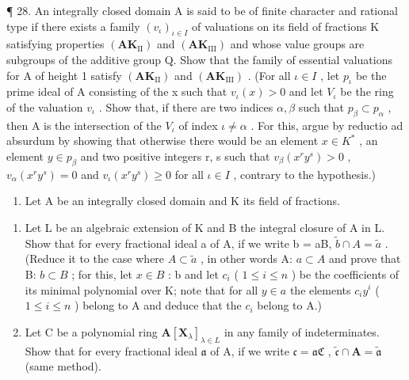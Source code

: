 ¶ 28. An integrally closed domain A is said to be of finite character and rational type if there exists a family \((v_{\iota})_{\iota \in I}\) of valuations on its field of fractions K satisfying properties \((\mathbf{AK}_{\mathrm{II}})\) and \((\mathbf{AK}_{\mathrm{III}})\) and whose value groups are subgroups of the additive group Q. Show that the family of essential valuations for A of height 1 satisfy \((\mathbf{AK}_{\mathrm{II}})\) and \((\mathbf{AK}_{\mathrm{III}})\) . (For all \(\iota \in I\) , let \(p_{\iota}\) be the prime ideal of A consisting of the x such that \(v_{\iota}(x) > 0\) and let \(V_{\iota}\) be the ring of the valuation \(v_{\iota}\) . Show that, if there are two indices \(\alpha, \beta\) such that \(p_{\beta} \subset p_{\alpha}\) , then A is the intersection of the \(V_{\iota}\) of index \(\iota \neq \alpha\) . For this, argue by reductio ad absurdum by showing that otherwise there would be an element \(x \in K^{*}\) , an element \(y \in p_{\beta}\) and two positive integers r, s such that \(v_{\beta}(x^{r}y^{s}) > 0\) , \(v_{\alpha}(x^{r}y^{s}) = 0\) and \(v_{\iota}(x^{r}y^{s}) \geqslant 0\) for all \(\iota \in I\) , contrary to the hypothesis.)

\begin{enumerate}
\def\labelenumi{\arabic{enumi}.}
\setcounter{enumi}{28}
\tightlist
\item
  Let A be an integrally closed domain and K its field of fractions.
\end{enumerate}

\begin{enumerate}
\def\labelenumi{(\alph{enumi})}
\item
  Let L be an algebraic extension of K and B the integral closure of A in L. Show that for every fractional ideal a of A, if we write b = aB, \(\tilde{b} \cap A = \tilde{a}\) . (Reduce it to the case where \(A \subset \tilde{a}\) , in other words A: \(a \subset A\) and prove that B: \(b \subset B\) ; for this, let \(x \in B\) : b and let \(c_i\) ( \(1 \leqslant i \leqslant n\) ) be the coefficients of its minimal polynomial over K; note that for all \(y \in a\) the elements \(c_i y^i\) ( \(1 \leqslant i \leqslant n\) ) belong to A and deduce that the \(c_i\) belong to A.)
\item
  Let C be a polynomial ring \(\mathbf{A}[\mathbf{X}_{\lambda}]_{\lambda \in L}\) in any family of indeterminates. Show that for every fractional ideal \(\mathfrak{a}\) of A, if we write \(\mathfrak{c} = \mathfrak{aC}\) , \(\tilde{\mathfrak{c}} \cap \mathbf{A} = \tilde{\mathfrak{a}}\) (same method).
\end{enumerate}

